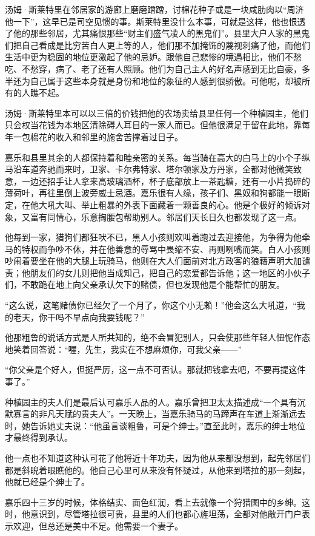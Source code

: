\par 汤姆·斯莱特里在邻居家的游廊上磨磨蹭蹭，讨棉花种子或是一块咸肋肉以“周济他一下”，这早已是司空见惯的事。斯莱特里没什么本事，可就是这样，他也恨透了他的那些邻居，尤其痛恨那些“财主们盛气凌人的黑鬼们”。县里大户人家的黑鬼们把自己看成是比穷苦白人更上等的人，他们那不加掩饰的蔑视刺痛了他，而他们生活中更为稳固的地位更激起了他的忌妒。跟他自己悲惨的境遇相比，他们不愁吃、不愁穿，病了、老了还有人照顾。他们为自己主人的好名声感到无比自豪，多半还为自己属于这些本身就是身份和地位的象征的人感到很骄傲。可他呢，却被所有的人瞧不起。
\par 汤姆·斯莱特里本可以以三倍的价钱把他的农场卖给县里任何一个种植园主，他们只会权当花钱为本地区清除碍人耳目的一家人而已。但他很满足于留在此地，靠每年一包棉花的收入和邻里的施舍苦撑着过日子。
\par 嘉乐和县里其余的人都保持着和睦亲密的关系。每当骑在高大的白马上的小个子纵马沿车道奔驰而来时，卫家、卡尔弗特家、塔尔顿家及方丹家，全都对他微笑致意，一边还招手让人拿来高玻璃酒杯，杯子底部放上一茶匙糖，还有一小片捣碎的薄荷叶，再往里倒上波旁威士忌酒。嘉乐很有人缘，孩子们、黑奴和狗都能一眼断定，在他大吼大叫、举止粗暴的外表下面藏着一颗善良的心。他是个极好的倾诉对象，又富有同情心，乐意掏腰包帮助别人。邻居们天长日久也都发现了这一点。
\par 他每到一家，猎狗们都狂吠不已，黑人小孩则欢叫着跑过去迎接他，为争得为他牵马的特权而争吵不休，并在他善意的辱骂中畏缩不安、再则咧嘴而笑。白人小孩则吵闹着要坐在他的大腿上玩骑马，他则在大人们面前对北方政客的狼藉声明大加谴责；他朋友们的女儿则把他当成知己，把自己的恋爱都告诉他；这一地区的小伙子们，不敢跪在地上向父亲承认欠下的赌债，但也发现他是个能帮忙的朋友。
\par “这么说，这笔赌债你已经欠了一个月了，你这个小无赖！”他会这么大吼道，“我的老天，你干吗不早点向我要钱呢？”
\par 他那粗鲁的说话方式是人所共知的，绝不会冒犯别人，只会使那些年轻人忸怩作态地笑着回答说：“喔，先生，我实在不想麻烦你，可我父亲——”
\par “你父亲是个好人，但挺严厉，这一点不可否认。那就把钱拿去吧，不要再提这件事了。”
\par 种植园主的夫人们是最后认可嘉乐人品的人。嘉乐曾把卫太太描述成“一个具有沉默寡言的非凡天赋的贵夫人”。一天晚上，当嘉乐骑马的马蹄声在车道上渐渐远去时，她告诉她丈夫说：“他虽言谈粗鲁，可是个绅士。”直至此时，嘉乐的绅士地位才最终得到承认。
\par 他一点也不知道这种认可花了他将近十年功夫，因为他从来都没想到，起先邻居们都是斜睨着眼瞧他的。他自己心里可从来没有怀疑过，从他来到塔拉的那一刻起，他就已经是个绅士了。
\par 嘉乐四十三岁的时候，体格结实、面色红润，看上去就像一个狩猎图中的乡绅。这时，他意识到，尽管塔拉很可贵，县里的人们也都心旌坦荡，全都对他敞开门户表示欢迎，但总还是美中不足。他需要一个妻子。
